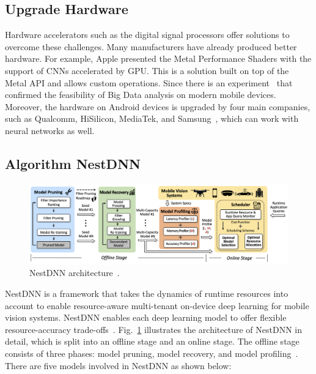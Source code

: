 \documentclass{article}
\begin{document}
\subsection{Upgrade Hardware}\label{upgrade_hardware}
Hardware accelerators such as the digital signal processors offer solutions to overcome these challenges. Many manufacturers have already produced better hardware. For example, Apple presented the Metal Performance Shaders with the support of CNNs accelerated by GPU. This is a solution built on top of the Metal API and allows custom operations. Since there is an experiment~\cite{akusok2019metal} that confirmed the feasibility of Big Data analysis on modern mobile devices. Moreover, the hardware on Android devices is upgraded by four main companies, such as Qualcomm, HiSilicon, MediaTek, and Samsung~\cite{Andrey2019Aibenchmark}, which can work with neural networks as well.

\subsection{Algorithm NestDNN}\label{nestdnn}
\begin{figure}[htbp]
	\centering
	\includegraphics[width=1\linewidth]{figure/nestdnn_arch.png}
	\caption{NestDNN architecture~\cite{fang2018nestdnn}.}
	\label{nestdnn_arch}
\end{figure}

NestDNN is a framework that takes the dynamics of runtime resources into account to enable resource-aware multi-tenant on-device deep learning for mobile vision systems. NestDNN enables each deep learning model to offer flexible resource-accuracy trade-offs~\cite{fang2018nestdnn}. Fig.~\ref{nestdnn_arch} illustrates the architecture of NestDNN in detail, which is split into an offline stage and an online stage. The offline stage consists of three phases: model pruning, model recovery, and model profiling~\cite{fang2018nestdnn}. There are five models involved in NestDNN as shown below:
\end{document}
